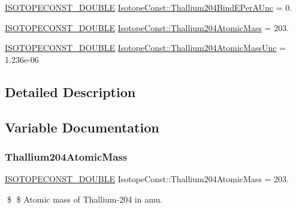 \begin{DoxyCompactItemize}
\mbox{\hyperlink{group___isotope_const-_macros_ga8f45a7272ce02c0b4c65c44636ed719a}{I\+S\+O\+T\+O\+P\+E\+C\+O\+N\+S\+T\+\_\+\+D\+O\+U\+B\+LE}} \mbox{\hyperlink{group___isotope_const-_thallium-_tl204_ga388cef80a9c4d0c931128898da637b23}{Isotope\+Const\+::\+Thallium204\+Bind\+E\+Per\+A\+Unc}} = 0.
\item 
\mbox{\hyperlink{group___isotope_const-_macros_ga8f45a7272ce02c0b4c65c44636ed719a}{I\+S\+O\+T\+O\+P\+E\+C\+O\+N\+S\+T\+\_\+\+D\+O\+U\+B\+LE}} \mbox{\hyperlink{group___isotope_const-_thallium-_tl204_ga5d816e423e05ccf3b765284196d50606}{Isotope\+Const\+::\+Thallium204\+Atomic\+Mass}} = 203.
\item 
\mbox{\hyperlink{group___isotope_const-_macros_ga8f45a7272ce02c0b4c65c44636ed719a}{I\+S\+O\+T\+O\+P\+E\+C\+O\+N\+S\+T\+\_\+\+D\+O\+U\+B\+LE}} \mbox{\hyperlink{group___isotope_const-_thallium-_tl204_ga8ed07952a0d8811e8065f1477805d35f}{Isotope\+Const\+::\+Thallium204\+Atomic\+Mass\+Unc}} = 1.\+236e-\/06
\end{DoxyCompactItemize}


\subsection{Detailed Description}


\subsection{Variable Documentation}
\mbox{\label{group___isotope_const-_thallium-_tl204_ga5d816e423e05ccf3b765284196d50606}} 
\subsubsection{\texorpdfstring{Thallium204\+Atomic\+Mass}{Thallium204AtomicMass}}
{\footnotesize\ttfamily \mbox{\hyperlink{group___isotope_const-_macros_ga8f45a7272ce02c0b4c65c44636ed719a}{I\+S\+O\+T\+O\+P\+E\+C\+O\+N\+S\+T\+\_\+\+D\+O\+U\+B\+LE}} Isotope\+Const\+::\+Thallium204\+Atomic\+Mass = 203.}

\$ \$ Atomic mass of Thallium-\/204 in amu. \mbox{\label{group___isotope_const-_thallium-_tl204_ga8ed07952a0d8811e8065f1477805d35f}} 
